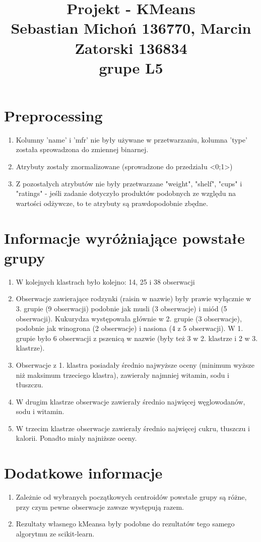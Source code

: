 \documentclass[12pt]{article}
\begin{document}
\title{Projekt - KMeans\\
\large Sebastian Michoń 136770, Marcin Zatorski 136834\\
\large grupe L5}
\date{\vspace{-10ex}}
\maketitle

\section{Preprocessing}
\begin{enumerate}
	\item Kolumny 'name' i 'mfr' nie były używane w przetwarzaniu, kolumna 'type' została sprowadzona do zmiennej binarnej.
	\item Atrybuty zostały znormalizowane (sprowadzone do przedziału <0;1>)
	\item Z pozostałych atrybutów nie były przetwarzane "weight", "shelf", "cups" i "ratings" - jeśli zadanie dotyczyło produktów podobnych ze względu na wartości odżywcze, to te atrybuty są prawdopodobnie zbędne.
\end{enumerate}

\section{Informacje wyróżniające powstałe grupy}
\begin{enumerate}
	\item W kolejnych klastrach było kolejno: 14, 25 i 38 obserwacji
	
	\item Obserwacje zawierające rodzynki (raisin w nazwie) były prawie wyłącznie w 3. grupie (9 obserwacji) podobnie jak musli (3 obserwacje) i miód (5 obserwacji). Kukurydza występowała głównie w 2. grupie (3 obserwacje), podobnie jak winogrona (2 obserwacje) i nasiona (4 z 5 obserwacji). W 1. grupie było 6 obserwacji z pszenicą w nazwie (były też 3 w 2. klastrze i 2 w 3. klastrze).
	
	\item Obserwacje z 1. klastra posiadały średnio najwyższe oceny (minimum wyższe niż maksimum trzeciego klastra), zawierały najmniej witamin, sodu i tłuszczu.
	
	\item W drugim klastrze obserwacje zawierały średnio najwięcej węglowodanów, sodu i witamin.
	
	\item W trzecim klastrze obserwacje zawierały średnio najwięcej cukru, tłuszczu i kalorii. Ponadto miały najniższe oceny.
\end{enumerate}

\section {Dodatkowe informacje}
\begin{enumerate}
	\item Zależnie od wybranych początkowych centroidów powstałe grupy są różne, przy czym pewne obserwacje zawsze występują razem.
	\item Rezultaty własnego kMeansa były podobne do rezultatów tego samego algorytmu ze scikit-learn.
\end{enumerate}
\end{document}
